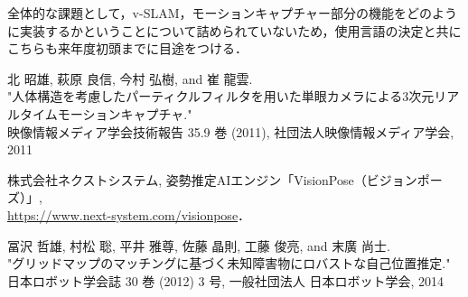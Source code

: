 \documentclass[11pt]{jreport}
\begin{document}
全体的な課題として，v-SLAM，モーションキャプチャー部分の機能をどのように実装するかということについて詰められていないため，使用言語の決定と共にこちらも来年度初頭までに目途をつける．





\begin{thebibliography}{99}

  北 昭雄, 萩原 良信, 今村 弘樹, and 崔 龍雲. \\
  "人体構造を考慮したパーティクルフィルタを用いた単眼カメラによる3次元リアルタイムモーションキャプチャ." \\
  映像情報メディア学会技術報告 35.9 巻 (2011), 社団法人映像情報メディア学会, 2011
  
  株式会社ネクストシステム, 
  姿勢推定AIエンジン「VisionPose（ビジョンポーズ）」,\\
  \url{https://www.next-system.com/visionpose}．

  冨沢 哲雄, 村松 聡, 平井 雅尊, 佐藤 晶則, 工藤 俊亮, and 末廣 尚士. \\
  "グリッドマップのマッチングに基づく未知障害物にロバストな自己位置推定." \\
  日本ロボット学会誌 30 巻 (2012) 3 号, 一般社団法人 日本ロボット学会, 2014

\end{thebibliography}


% 
% 
% 

\end{document}
